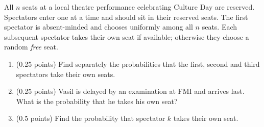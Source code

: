 \documentclass[a4paper]{report}
\begin{document}
\begin{problem}
All $n$ seats at a local theatre performance celebrating Culture Day are reserved. Spectators enter one at a time and should sit in their reserved seats. The first spectator is absent-minded and chooses uniformly among all $n$ seats. Each subsequent spectator takes their own seat if available; otherwise they choose a random \emph{free} seat.
\begin{enumerate}
\item (0.25 points) Find separately the probabilities that the first, second and third spectators take their own seats.
\item (0.25 points) Vasil is delayed by an examination at FMI and arrives last. What is the probability that he takes his own seat?
\item (0.5 points) Find the probability that spectator $k$ takes their own seat.
\end{enumerate}
\end{problem}
\end{document}

